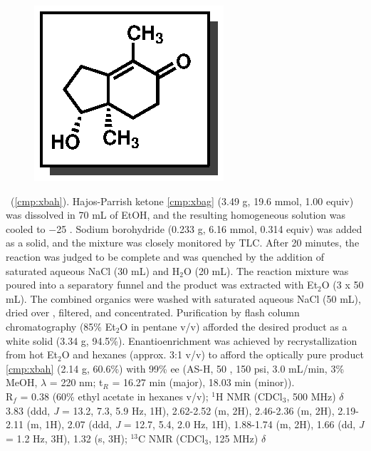 \pagebreak
\begin{figure}
  \vspace{-12pt}
  \begin{center}
    \includegraphics[scale=0.8]{chp_singlecarbon/images/xbah}
  \end{center}
  \vspace{-30pt}
\end{figure}\noindent \textbf{\CMPxbah}\ (\ref{cmp:xbah}). Hajos-Parrish ketone \ref{cmp:xbag}
(3.49 g, 19.6 mmol, 1.00 equiv) was dissolved in 70 mL of EtOH, and the resulting
homogeneous solution was cooled to $-$25 \degc. Sodium borohydride (0.233 g, 6.16
mmol, 0.314 equiv) was added as a solid, and the mixture was closely monitored
by TLC. After 20 minutes, the reaction was judged to be complete and was quenched by the
addition of saturated aqueous NaCl (30 mL) and H$_2$O (20 mL). The reaction mixture was poured
into a separatory funnel and the product was extracted with Et$_2$O (3 x 50 mL). The combined
organics were washed with saturated aqueous NaCl (50 mL), dried over , filtered, and
concentrated. Purification by flash column chromatography (85\% Et$_2$O in pentane v/v) afforded the
desired product as a white solid (3.34 g, 94.5\%). Enantioenrichment was achieved by
recrystallization from hot Et$_2$O and hexanes (approx. 3:1 v/v) to afford the optically pure
product \ref{cmp:xbah} (2.14 g, 60.6\%) with 99\% ee (AS-H, 50 \degc, 150 psi, 3.0 mL/min, 3\% MeOH,
$\lambda$ = 220 nm; t$_R$ = 16.27 min (major), 18.03 min (minor)).\\
R$_f$ = 0.38 (60\% ethyl acetate in hexanes v/v); $^1$H NMR (CDCl$_3$, 500 MHz) $\delta$ 3.83 (ddd,
\textit{J} = 13.2, 7.3, 5.9 Hz, 1H), 2.62-2.52 (m, 2H), 2.46-2.36 (m, 2H), 2.19-2.11 (m, 1H), 2.07 (ddd, \textit{J} = 12.7, 5.4, 2.0 Hz, 1H), 1.88-1.74
(m, 2H), 1.66 (dd, \textit{J} = 1.2 Hz, 3H), 1.32 (s, 3H); $^{13}$C NMR (CDCl$_3$, 125 MHz) $\delta$
